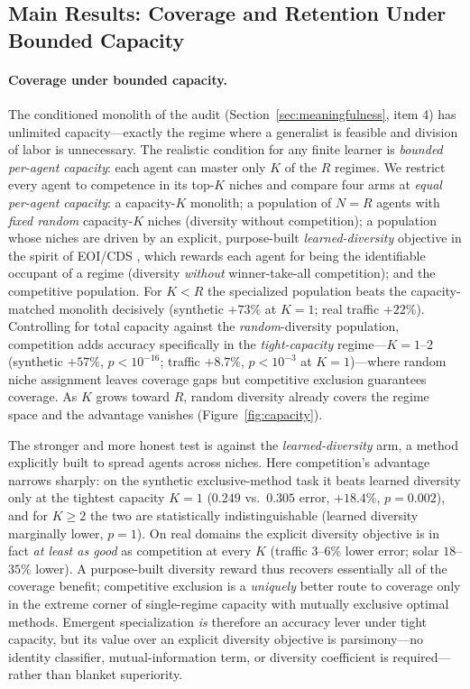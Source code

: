 \documentclass{article}
\begin{document}
\subsection{Main Results: Coverage and Retention Under Bounded Capacity}
\label{sec:mainresults}

\paragraph{Coverage under bounded capacity.} The
conditioned monolith of the audit (Section~\ref{sec:meaningfulness}, item 4) has
unlimited capacity---exactly the regime where a generalist is
feasible and division of labor is unnecessary. The realistic condition for any
finite learner is \emph{bounded per-agent capacity}: each agent can master only
$K$ of the $R$ regimes. We restrict every agent to competence in its top-$K$
niches and compare four arms at \emph{equal per-agent capacity}: a capacity-$K$
monolith; a population of $N{=}R$ agents with \emph{fixed random} capacity-$K$
niches (diversity without competition); a population whose niches are driven by an
explicit, purpose-built \emph{learned-diversity} objective in the spirit of
EOI/CDS \cite{jiang2021eoi,li2021cds}, which rewards each agent for being the
identifiable occupant of a regime (diversity \emph{without} winner-take-all
competition); and the competitive population. For
$K{<}R$ the specialized population beats the capacity-matched monolith
decisively (synthetic $+73\%$ at $K{=}1$; real traffic $+22\%$). Controlling for
total capacity against the \emph{random}-diversity population, competition adds accuracy
specifically in the \emph{tight-capacity} regime---$K{=}1$--$2$ (synthetic
$+57\%$, $p<10^{-16}$; traffic $+8.7\%$, $p<10^{-3}$ at $K{=}1$)---where random
niche assignment leaves coverage gaps but competitive exclusion guarantees
coverage. As $K$ grows toward $R$, random diversity already covers the regime
space and the advantage vanishes (Figure~\ref{fig:capacity}).

The stronger and more honest test is against the \emph{learned-diversity} arm,
a method explicitly built to spread agents across niches. Here competition's
advantage narrows sharply: on the synthetic exclusive-method task it beats learned
diversity only at the tightest capacity $K{=}1$ ($0.249$ vs.\ $0.305$ error,
$+18.4\%$, $p{=}0.002$), and for $K\geq2$ the two are statistically
indistinguishable (learned diversity marginally lower, $p{=}1$). On real domains
the explicit diversity objective is in fact \emph{at least as good} as competition
at every $K$ (traffic $3$--$6\%$ lower error; solar $18$--$35\%$ lower). A
purpose-built diversity reward thus recovers essentially all of the coverage
benefit; competitive exclusion is a \emph{uniquely} better route to coverage only
in the extreme corner of single-regime capacity with mutually exclusive optimal
methods. Emergent specialization \emph{is} therefore an accuracy lever under tight
capacity, but its value over an explicit diversity objective is parsimony---no
identity classifier, mutual-information term, or diversity coefficient is
required---rather than blanket superiority.
\end{document}
